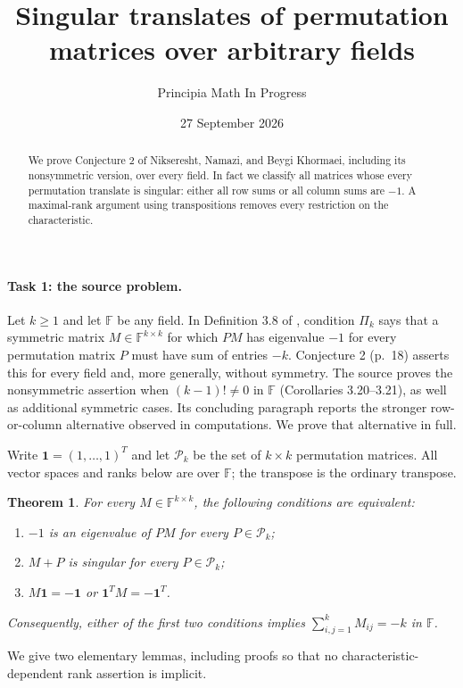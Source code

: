 \documentclass[11pt]{article}
\title{Singular translates of permutation matrices over arbitrary fields}
\author{Principia Math In Progress}
\date{27 September 2026}
\newtheorem{theorem}{Theorem}
\newcommand{\F}{\mathbb F}
\begin{document}
\maketitle
\begin{abstract}
We prove Conjecture 2 of Nikseresht, Namazi, and Beygi Khormaei,
including its nonsymmetric version, over every field. In fact we classify
all matrices whose every permutation translate is singular: either all row
sums or all column sums are $-1$. A maximal-rank argument using
transpositions removes every restriction on the characteristic.
\end{abstract}

\paragraph{Task 1: the source problem.}
Let $k\geq1$ and let $\F$ be any field. In Definition 3.8 of
\cite{source}, condition $\Pi_k$ says that a symmetric matrix
$M\in\F^{k\times k}$ for which $PM$ has eigenvalue $-1$ for every
permutation matrix $P$ must have sum of entries $-k$. Conjecture 2
(p.~18) asserts this for every field and, more generally, without symmetry.
The source proves the nonsymmetric assertion when $(k-1)!\ne0$ in
$\F$ (Corollaries 3.20--3.21), as well as additional symmetric cases.
Its concluding paragraph reports the stronger row-or-column alternative
observed in computations. We prove that alternative in full.

Write $\mathbf1=(1,\ldots,1)^T$ and let $\mathcal P_k$ be the set of
$k\times k$ permutation matrices. All vector spaces and ranks below are
over $\F$; the transpose is the ordinary transpose.

\begin{theorem}\label{thm:main}
For every $M\in\F^{k\times k}$, the following conditions are equivalent:
\begin{enumerate}
\item $-1$ is an eigenvalue of $PM$ for every $P\in\mathcal P_k$;
\item $M+P$ is singular for every $P\in\mathcal P_k$;
\item $M\mathbf1=-\mathbf1$ or $\mathbf1^TM=-\mathbf1^T$.
\end{enumerate}
Consequently, either of the first two conditions implies
$\sum_{i,j=1}^k M_{ij}=-k$ in $\F$.
\end{theorem}

We give two elementary lemmas, including proofs so that no
characteristic-dependent rank assertion is implicit.
\end{document}
